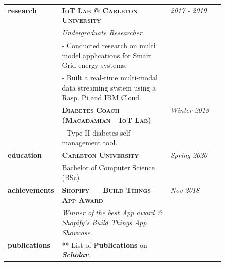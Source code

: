 \documentclass[9pt]{article}
\begin{document}
\begin{longtable}{@{}>{\raggedleft}p{0.25\linewidth}
                          p{}>{}p{0.25\linewidth}@{}}
                \textbf{research}
            & \textbf{\textsc{IoT Lab @ Carleton University}} & \textit{2017 - 2019} \\
            & \textit{Undergraduate Researcher} \\
            & - Conducted research on multi model applications for Smart Grid energy systems. \\
            & - Built a real-time multi-modal data streaming system using a Rasp. Pi and IBM Cloud. \\ [0.5em]

            & \textbf{\textsc{Diabetes Coach (Macadamian---IoT Lab)}} & \textit{Winter 2018} \\
            & - Type II diabetes self management tool. \\ [1em]

        \textbf{education}
            & \textbf{\textsc{Carleton University}} & \textit{Spring 2020} \\
            & Bachelor of Computer Science (BSc) \\ [1em]

        \textbf{achievements}
            & \textbf{\textsc{Shopify --- Build Things App Award}} & \textit{Nov 2018} \\
            & \textit{Winner of the best App award @ Shopify's Build Things App Showcase}. \\ [1em]

        \textbf{publications}
            & ** List of \textbf{Publications} on \textit{\href{https://scholar.google.ca/citations?user=zFDREhgAAAAJ\&hl=en}{\textbf{Scholar}}}.\\ [0.5em]


  \end{longtable}
\end{document}
